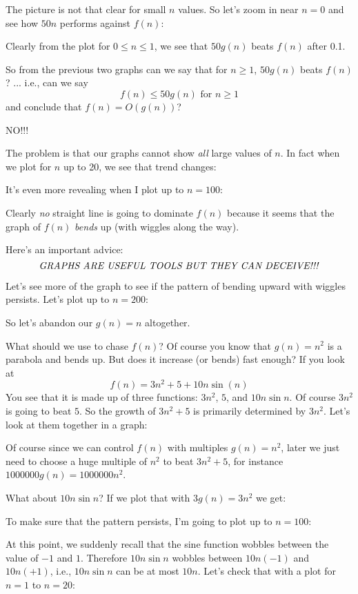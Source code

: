 The picture is not that clear for small $n$ values.
So let's zoom in near $n = 0$ and see how $50n$ performs
against $f(n)$:

Clearly from the plot for $0 \leq n \leq 1$, we see that
$50g(n)$ beats $f(n)$ after 0.1.

So from the previous two graphs
can we say that for $n \geq 1$, $50g(n)$ beats $f(n)$? ... i.e.,
can we say
\[
f(n) \leq 50 g(n) \text{ for $n \geq 1$}
\]
and conclude that $f(n) = O(g(n))$?

NO!!!

The problem is that our graphs cannot show \textit{all}
large values of $n$.
In fact when we plot for $n$ up to 20, we see that trend changes:


It's even more revealing when I plot up to $n = 100$:


Clearly \textit{no} straight line is going to dominate $f(n)$ because
it seems that the graph of $f(n)$ \textit{bends} up (with wiggles along the way).

Here's an important advice:
\[
\text{\textit{GRAPHS ARE USEFUL TOOLS BUT THEY CAN DECEIVE!!!}}
\]

Let's see more of the graph to see if the pattern of bending
upward with wiggles persists.
Let's plot up to $n = 200$:


So let's abandon our $g(n) = n$ altogether.

What should we use to chase $f(n)$?
Of course you know that $g(n) = n^2$ is a parabola and bends up.
But does it increase (or bends) fast enough?
If you look at 
\[
f(n) = 3n^2 + 5 + 10 n \sin (n)
\]
You see that it is made up of three functions:
$3n^2$, $5$, and $10n \sin n$.
Of course $3n^2$ is going to beat $5$.
So the growth of $3n^2 + 5$ is primarily determined by $3n^2$.
Let's look at them together in a graph:

Of course since we can control $f(n)$ with multiples $g(n) = n^2$,
later we just need to choose a huge multiple of $n^2$ to 
beat $3n^2 + 5$, for instance $1000000 g(n) = 1000000 n^2$.

What about $10n \sin n$?
If we plot that with $3g(n) = 3n^2$ we get:

To make sure that the pattern persists, I'm going to plot up
to $n = 100$:


At this point, we suddenly recall that the sine function
wobbles between the value of $-1$ and $1$.
Therefore $10n \sin n$ wobbles between $10n (-1)$ and $10n (+1)$,
i.e., $10n \sin n$ can be at most $10n$.
Let's check that with a plot for $n = 1$ to $n = 20$:


